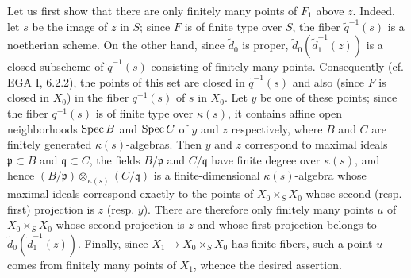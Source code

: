 Let us first show that there are only finitely many points of $F_1$ above $z$. Indeed, let $s$ be the image of $z$ in $S$; since $F$ is of finite type over $S$, the fiber $\widetilde q^{-1}(s)$ is a noetherian scheme. On the other hand, since $\widetilde d_0$ is proper, $\widetilde d_0(\widetilde d_1^{-1}(z))$ is a closed subscheme of $\widetilde q^{-1}(s)$ consisting of finitely many points. Consequently (cf. EGA I, 6.2.2), the points of this set are closed in $\widetilde q^{-1}(s)$ and also (since $F$ is closed in $X_0$) in the fiber $q^{-1}(s)$ of $s$ in $X_0$. Let $y$ be one of these points; since the fiber $q^{-1}(s)$ is of finite type over $\kappa(s)$, it contains affine open neighborhoods $\operatorname{Spec} B$ and $\operatorname{Spec} C$ of $y$ and $z$ respectively, where $B$ and $C$ are finitely generated $\kappa(s)$-algebras. Then $y$ and $z$ correspond to maximal ideals $\mathfrak p\subset B$ and $\mathfrak q\subset C$, the fields $B/\mathfrak p$ and $C/\mathfrak q$ have finite degree over $\kappa(s)$, and hence $(B/\mathfrak p)\otimes_{\kappa(s)}(C/\mathfrak q)$ is a finite-dimensional $\kappa(s)$-algebra whose maximal ideals correspond exactly to the points of $X_0\times_SX_0$ whose second (resp. first) projection is $z$ (resp. $y$). There are therefore only finitely many points $u$ of $X_0\times_SX_0$ whose second projection is $z$ and whose first projection belongs to $\widetilde d_0(\widetilde d_1^{-1}(z))$. Finally, since $X_1\to X_0\times_SX_0$ has finite fibers, such a point $u$ comes from finitely many points of $X_1$, whence the desired assertion.

